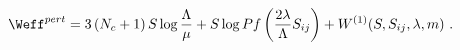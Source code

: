 \begin{equation}
\Weff^{pert}=3\left(N_c+1\right)S\log{\frac{\Lambda}{\mu}}
+S\log{Pf\left(\frac{2\lambda}{\Lambda} S_{ij} \right)} + 
W^{(1)}(S,S_{ij},\lambda,m) ~.
\end{equation}

